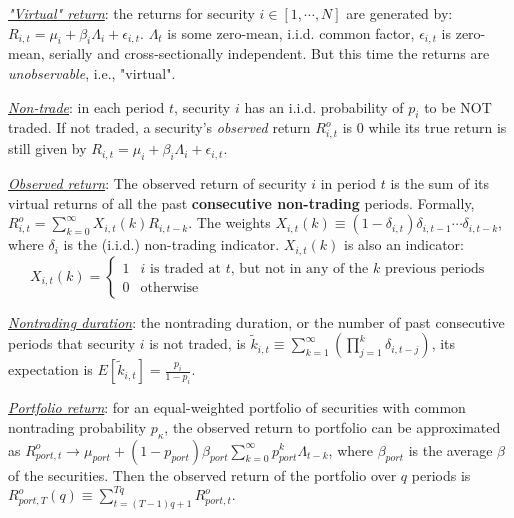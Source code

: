 \begin{enumerate}
\begin{enumerate}
        \underline{\textit{"Virtual" return}}: the returns for security $i\in[1,\cdots,N]$ are generated by: $R_{i,t}=\mu_i+\beta_i\Lambda_i+\epsilon_{i,t}$. $\Lambda_t$ is
        some zero-mean, i.i.d. common factor, $\epsilon_{i,t}$ is zero-mean, serially and cross-sectionally independent. But this time the returns are \textit{unobservable}, i.e., "virtual".
        
        \underline{\textit{Non-trade}}: in each period $t$, security $i$ has an i.i.d. probability of $p_i$ to be NOT traded. If not traded, a security's \textit{observed} return $R^o_{i,t}$ is 0 while its
        true return is still given by $R_{i,t}=\mu_i+\beta_i\Lambda_i+\epsilon_{i,t}$. 
        
        \underline{\textit{Observed return}}: The observed return of security $i$ in period $t$ is the sum of its virtual returns of all the past \textbf{consecutive non-trading} periods.
        Formally, $R^o_{i,t}=\sum^{\infty}_{k=0}X_{i,t}(k)R_{i,t-k}$. The weights $X_{i,t}(k)\equiv(1-\delta_{i,t})\delta_{i,t-1} \cdots \delta_{i,t-k}$,
        where $\delta_i$ is the (i.i.d.) non-trading indicator. 
        $X_{i,t}(k)$ is also an indicator:
        \begin{equation*}
            X_{i,t}(k) =
              \begin{cases}
                1 & \text{$i$ is traded at $t$, but not in any of the $k$ previous periods}\\
                0 & \text{otherwise}
              \end{cases}       
          \end{equation*}
        
        \underline{\textit{Nontrading duration}}: the nontrading duration, or the number of past consecutive periods that security $i$ is not traded, 
        is $\tilde{k}_{i,t}\equiv \sum^{\infty}_{k=1}\left(\prod_{j=1}^k\delta_{i,t-j}\right)$, its expectation is $E[\tilde{k}_{i,t}]=\frac{p_i}{1-p_i}$.
        
        \underline{\textit{Portfolio return}}: for an equal-weighted portfolio of securities with common nontrading probability $p_{\kappa}$, the observed return to
        portfolio can be approximated as $R_{port,t}^o\rightarrow \mu_{port}+(1-p_{port})\beta_{port}\sum^{\infty}_{k=0}p_{port}^k\Lambda_{t-k}$, where $\beta_{port}$ is the
        average $\beta$ of the securities. Then the observed return of the portfolio over $q$ periods is $R^o_{port,T}(q)\equiv \sum^{Tq}_{t=(T-1)q+1}R^o_{port,t}$.
    

\end{enumerate}
\end{enumerate}
